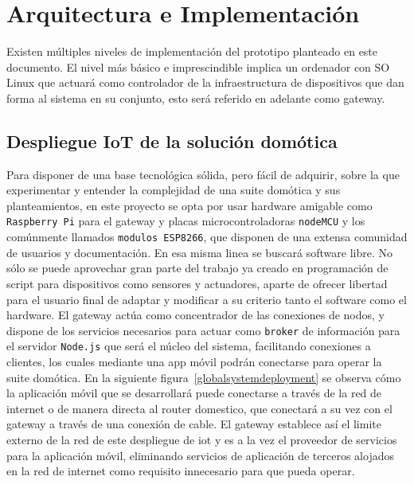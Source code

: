\cleardoublepage

\chapter{Arquitectura e Implementación}
\label{ch:Capitulo4}

Existen múltiples niveles de implementación del prototipo planteado en este documento. El nivel más básico e imprescindible implica un ordenador con SO Linux que actuará como controlador de la infraestructura de dispositivos que dan forma al sistema en su conjunto, esto será referido en adelante como \gls{gateway}.

\vspace{1cm}

\section{Despliegue IoT de la solución domótica}
\label{ch:Capitulo4.1}

Para disponer de una base tecnológica sólida, pero fácil de adquirir, sobre la que experimentar y entender la complejidad de una suite domótica y sus planteamientos, en este proyecto se opta por usar hardware amigable como \verb|Raspberry Pi| para el \gls{gateway} y placas microcontroladoras \verb|nodeMCU| y los comúnmente llamados \verb|modulos ESP8266|, que disponen de una extensa comunidad de usuarios y documentación. En esa misma linea se buscará software libre. No sólo se puede aprovechar gran parte del trabajo ya creado en programación de \gls{script} para dispositivos como sensores y actuadores, aparte de ofrecer libertad para el usuario final de adaptar y modificar a su criterio tanto el software como el hardware. El \gls{gateway} actúa como concentrador de las conexiones de nodos, y dispone de los servicios necesarios para actuar como \verb|broker| de información para el servidor \verb|Node.js| que será el núcleo del sistema, facilitando conexiones a clientes, los cuales mediante una \gls{app} móvil podrán conectarse para operar la suite domótica. En la siguiente figura~\ref{globalsystemdeployment} se observa cómo la aplicación móvil que se desarrollará puede conectarse a través de la red de internet o de manera directa al router domestico, que conectará a su vez con el \gls{gateway} a través de una conexión de cable. El \gls{gateway} establece así el limite externo de la red de este despliegue de \gls{iot} y es a la vez el proveedor de servicios para la aplicación móvil, eliminando servicios de aplicación de terceros alojados en la red de internet como requisito innecesario para que pueda operar.

